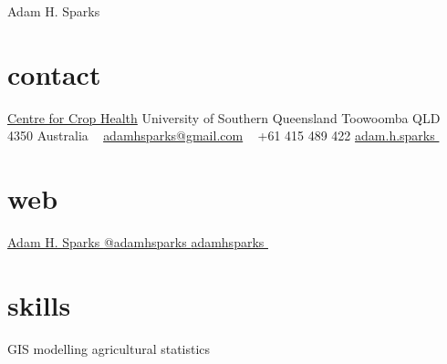 
\hfill {\Huge Adam H. Sparks}

\begin{aside}
\small{\section{contact}
\href{http://www.usq.edu.au/research/research-at-usq/institutes-centres/cch}{Centre for Crop Health}
University of Southern Queensland
Toowoomba QLD 4350
Australia
~
\href{mailto:adamhsparks@gmail.com}{adamhsparks@gmail.com}
~
+61 415 489 422  \faMobilePhone
{\href{skype:adam.h.sparks?call}{adam.h.sparks }}
~
\section{web}
\href{https://ph.linkedin.com/pub/adam-sparks/8b/b96/507}{Adam H. Sparks {\color{linkedin}\FA {}}}
\href{https://www.twitter.com/adamhsparks/}{@adamhsparks {\color{twitter.blue}\FA {}}}
\href{https://github.com/adamhsparks/}{adamhsparks \FA {}}
~
\section{skills}
GIS
modelling
agricultural statistics}
\end{aside}

